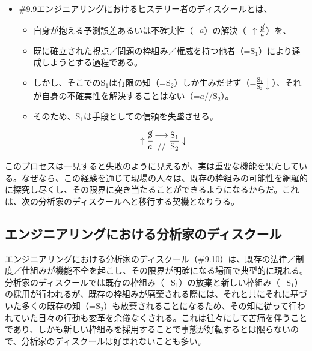\begin{note}{}
  \begin{itemize}
    \tightlist
    \item{\#9.9}エンジニアリングにおけるヒステリー者のディスクールとは、
      \begin{itemize}
        \tightlist
        \item 自身が抱える予測誤差あるいは不確実性（=$a$）の解決（=$\uparrow\frac{\cancel{\textrm{S}}}{a}$）を、
        \item 既に確立された視点／問題の枠組み／権威を持つ他者（=$\textrm{S}_1$）により達成しようとする過程である。
        \item しかし、そこでの$\textrm{S}_1$は有限の知（=$\textrm{S}_2$）しか生みだせず（=$\frac{\textrm{S}_1}{\textrm{S}_2}\downarrow$）、それが自身の不確実性を解決することはない（=$a//\textrm{S}_2$）。
        \item そのため、$\textrm{S}_1$は手段としての信頼を失墜させる。
      \end{itemize}

$$
\uparrow\frac{\cancel{\textrm{S}}}{a}\genfrac{}{}{0pt}{}{\longrightarrow}{//}\frac{\mathrm{S_1}}{\mathrm{S_2}}\downarrow
$$
  \end{itemize}
\end{note}

このプロセスは一見すると失敗のように見えるが、実は重要な機能を果たしている。なぜなら、この経験を通じて現場の人々は、既存の枠組みの可能性を網羅的に探究し尽くし、その限界に突き当たることができるようになるからだ。これは、次の分析家のディスクールへと移行する契機となりうる。

\subsection{エンジニアリングにおける分析家のディスクール}\label{ux30a8ux30f3ux30b8ux30cbux30a2ux30eaux30f3ux30b0ux306bux304aux3051ux308bux5206ux6790ux5bb6ux306eux30c7ux30a3ux30b9ux30afux30fcux30eb}

エンジニアリングにおける分析家のディスクール（\#9.10）は、既存の法律／制度／仕組みが機能不全を起こし、その限界が明確になる場面で典型的に現れる。分析家のディスクールでは既存の枠組み（=\(\textrm{S}_1\)）の放棄と新しい枠組み（=\(\textrm{S}_1\)）の採用が行われるが、既存の枠組みが廃棄される際には、それと共にそれに基づいた多くの既存の知（=\(\textrm{S}_2\)）も放棄されることになるため、その知に従って行われていた日々の行動も変革を余儀なくされる。これは往々にして苦痛を伴うことであり、しかも新しい枠組みを採用することで事態が好転するとは限らないので、分析家のディスクールは好まれないことも多い。

